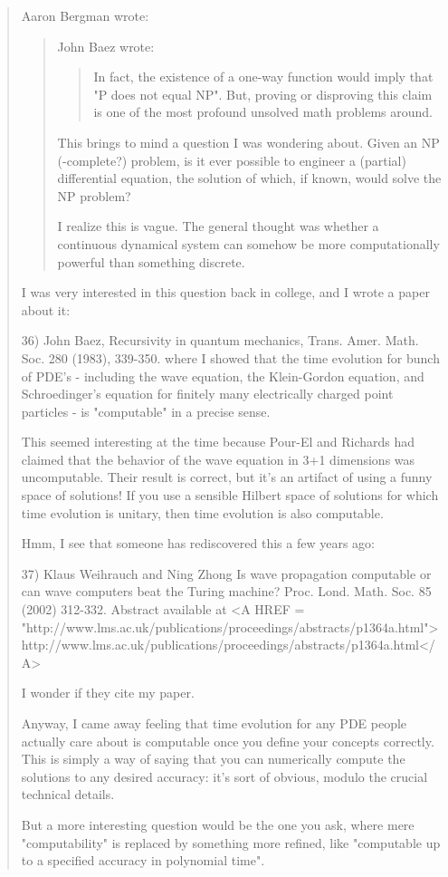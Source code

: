 \begin{quote}
Aaron Bergman wrote:

\begin{quote}
John Baez wrote:

\begin{quote}
In fact, the existence of a one-way function would imply that 
"P does not equal NP".  But, proving or disproving this claim is one 
of the most profound unsolved math problems around.  
\end{quote}

This brings to mind a question I was wondering about. Given an NP 
(-complete?) problem, is it ever possible to engineer a (partial) 
differential equation, the solution of which, if known, would solve the 
NP problem?

I realize this is vague. The general thought was whether a continuous 
dynamical system can somehow be more computationally powerful than 
something discrete.
\end{quote}

I was very interested in this question back in college, and I
wrote a paper about it:

36) John Baez, Recursivity in quantum mechanics, Trans. Amer. Math. Soc. 280 
(1983), 339-350.
where I showed that the time evolution for bunch of PDE's -
including the wave equation, the Klein-Gordon equation, and 
Schroedinger's equation for finitely many electrically 
charged point particles - is "computable" in a precise sense.

This seemed interesting at the time because Pour-El and Richards
had claimed that the behavior of the wave equation in 3+1 dimensions
was uncomputable.  Their result is correct, but it's an artifact
of using a funny space of solutions!  If you use a sensible Hilbert space 
of solutions for which time evolution is unitary, then time evolution 
is also computable.

Hmm, I see that someone has rediscovered this a few years ago:

37) Klaus Weihrauch and Ning Zhong
Is wave propagation computable or can wave computers beat the Turing machine?
Proc. Lond. Math. Soc. 85 (2002) 312-332.  Abstract available at
<A HREF = "http://www.lms.ac.uk/publications/proceedings/abstracts/p1364a.html">http://www.lms.ac.uk/publications/proceedings/abstracts/p1364a.html</A>

I wonder if they cite my paper.

Anyway, I came away feeling that time evolution for any PDE people actually
care about is computable once you define your concepts correctly.  This is 
simply a way of saying that you can numerically compute the solutions to any
desired accuracy: it's sort of obvious, modulo the crucial technical details.

But a more interesting question would be the one you ask, where
mere "computability" is replaced by something more refined, like
"computable up to a specified accuracy in polynomial time".  
\end{quote}

